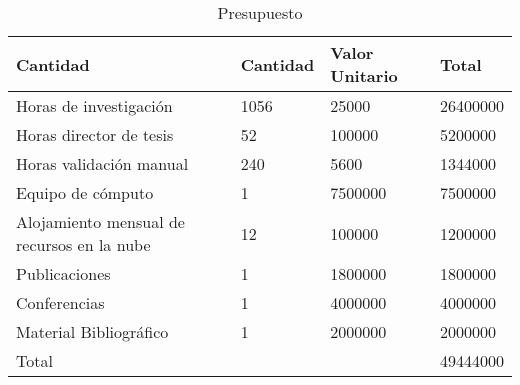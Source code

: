 
\begin{table}[]
\centering
\caption{Presupuesto}
\label{tab:cost_structure}
\begin{tabular}{|l|l|l|l|}
\toprule
Cantidad                                   & Cantidad       & Valor Unitario   & Total          \\
\hline
Horas de investigación                     & 1056           & 25000   & 26400000 \\
\hline
Horas director de tesis                    & 52             & 100000  & 5200000  \\
\hline
Horas validación manual                    & 240            & 5600    & 1344000  \\
\hline
Equipo de cómputo                          & 1              & 7500000 & 7500000  \\
\hline
Alojamiento mensual de recursos en la nube & 12             & 100000  & 1200000  \\
\hline
Publicaciones                              & 1              & 1800000 & 1800000  \\
\hline
Conferencias                               & 1              & 4000000 & 4000000  \\
\hline
Material Bibliográfico                     & 1              & 2000000 & 2000000  \\
\hline
Total                                      &                &         & 49444000 \\
\hline
\end{tabular}
\end{table}
